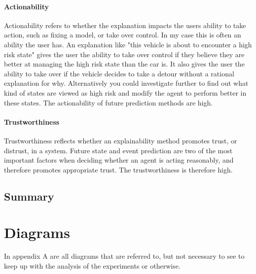\documentclass[UKenglish]{uiomasterthesis}
\begin{document}
\subsubsection{Actionability}
Actionability refers to whether the explanation impacts the users ability to take action, such as fixing a model, or take over control. In my case this is often an ability the user has. An explanation like "this vehicle is about to encounter a high risk state" gives the user the ability to take over control if they believe they are better at managing the high risk state than the car is. It also gives the user the ability to take over if the vehicle decides to take a detour without a rational explanation for why. Alternatively you could investigate further to find out what kind of states are viewed as high risk and modify the agent to perform better in these states. The actionability of future prediction methods are high.

\subsubsection{Trustworthiness}
Trustworthiness reflects whether an explainability method promotes trust, or distrust, in a system. Future state and event prediction are two of the most important factors when deciding whether an agent is acting reasonably, and therefore promotes appropriate trust. The trustworthiness is therefore high.


\cite{chung2024predictingfutureactionsreinforcement}

\section{Summary}

\appendix

\chapter{Diagrams}
In appendix A are all diagrams that are referred to, but not necessary to see to keep up with the analysis of the experiments or otherwise.


\printbibliography{}
\end{document}
